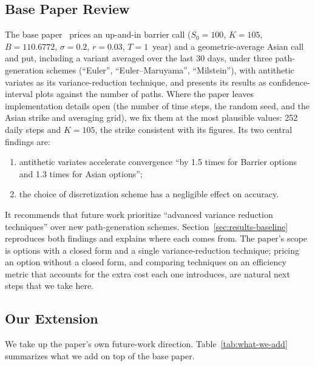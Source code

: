 \documentclass[sigconf]{acmart}
\begin{document}
\subsection{Base Paper Review}
\label{sec:base-paper}
The base paper~\cite{Gottimukkala2024} prices an up-and-in barrier call
($S_0=100$, $K=105$, $B=110.6772$, $\sigma=0.2$, $r=0.03$, $T=1$~year) and a
geometric-average Asian call and put, including a variant averaged over the
last 30 days, under three path-generation schemes (``Euler'',
``Euler--Maruyama'', ``Milstein''), with antithetic variates as its
variance-reduction technique, and presents its results as
confidence-interval plots against the number of paths. Where the paper leaves
implementation details open (the number of time steps, the random seed, and
the Asian strike and averaging grid), we fix them at the most plausible
values: 252 daily steps and $K=105$, the strike consistent with its figures.
Its two central findings are:
\begin{enumerate}
  \item antithetic variates accelerate convergence ``by 1.5 times for Barrier
    options and 1.3 times for Asian options'';
  \item the choice of discretization scheme has a negligible effect on
    accuracy.
\end{enumerate}
It recommends that future work prioritize ``advanced variance reduction
techniques'' over new path-generation schemes.
Section~\ref{sec:results-baseline} reproduces both findings and explains
where each comes from. The paper's scope is options with a closed form and
a single variance-reduction technique; pricing an option without a closed
form, and comparing techniques on an efficiency metric that accounts for the
extra cost each one introduces, are natural next steps that we take here.

\subsection{Our Extension}
We take up the paper's own future-work direction. Table~\ref{tab:what-we-add}
summarizes what we add on top of the base paper.
\end{document}
